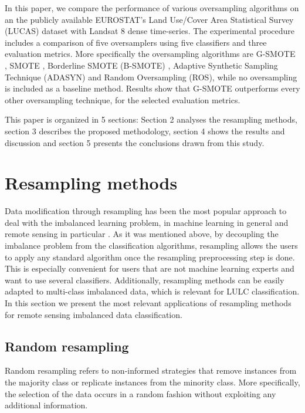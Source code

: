\documentclass[remotesensing,article,submit,moreauthors,pdftex]{Definitions/mdpi}
\begin{document}
In this paper, we compare the performance of various oversampling algorithms on
an the publicly available EUROSTAT's Land Use/Cover Area Statistical Survey
(LUCAS) dataset \cite{LUCAS2015} with Landsat 8 dense time-series. The
experimental procedure includes a comparison of five oversamplers using five
classifiers and three evaluation metrics. More specifically the oversampling
algorithms are G-SMOTE \cite{Douzas2019}, SMOTE \cite{Chawla2002}, Borderline
SMOTE (B-SMOTE) \cite{Han2005}, Adaptive Synthetic Sampling Technique (ADASYN)
\cite{HaiboHe2008} and Random Oversampling (ROS), while no oversampling is
included as a baseline method. Results show that G-SMOTE outperforms every other
oversampling technique, for the selected evaluation metrics.

This paper is organized in 5 sections: Section 2 analyses the resampling methods,
section 3 describes the proposed methodology, section 4 shows the results and
discussion and section 5 presents the conclusions drawn from this study.

\section{Resampling methods}

Data modification through resampling has been the most popular approach to deal
with the imbalanced learning problem, in machine learning in general and remote
sensing in particular \cite{Feng2019}. As it was mentioned above, by decoupling
the imbalance problem from the classification algorithms, resampling allows the
users to apply any standard algorithm once the resampling preprocessing step is
done. This is especially convenient for users that are not machine learning
experts and want to use several classifiers. Additionally, resampling methods
can be easily adapted to multi-class imbalanced data, which is relevant for LULC
classification. In this section we present the most relevant applications of
resampling methods for remote sensing imbalanced data classification.

\subsection{Random resampling}

Random resampling refers to non-informed strategies that remove instances from
the majority class or replicate instances from the minority class. More
specifically, the selection of the data occurs in a random fashion without
exploiting any additional information.
\end{document}
